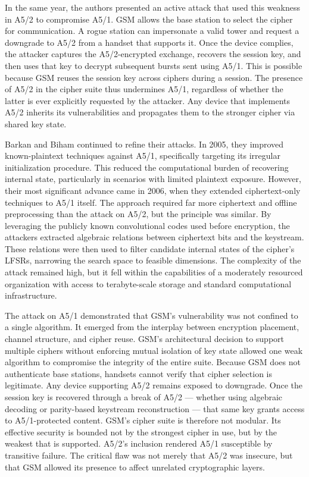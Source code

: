 In the same year, the authors presented an active attack that used this weakness in A5/2 to compromise A5/1. GSM allows the base station to select the cipher for communication. A rogue station can impersonate a valid tower and request a downgrade to A5/2 from a handset that supports it. Once the device complies, the attacker captures the A5/2-encrypted exchange, recovers the session key, and then uses that key to decrypt subsequent bursts sent using A5/1. This is possible because GSM reuses the session key across ciphers during a session. The presence of A5/2 in the cipher suite thus undermines A5/1, regardless of whether the latter is ever explicitly requested by the attacker. Any device that implements A5/2 inherits its vulnerabilities and propagates them to the stronger cipher via shared key state.

Barkan and Biham continued to refine their attacks. In 2005, they improved known-plaintext techniques against A5/1, specifically targeting its irregular initialization procedure. This reduced the computational burden of recovering internal state, particularly in scenarios with limited plaintext exposure. However, their most significant advance came in 2006, when they extended ciphertext-only techniques to A5/1 itself. The approach required far more ciphertext and offline preprocessing than the attack on A5/2, but the principle was similar. By leveraging the publicly known convolutional codes used before encryption, the attackers extracted algebraic relations between ciphertext bits and the keystream. These relations were then used to filter candidate internal states of the cipher’s LFSRs, narrowing the search space to feasible dimensions. The complexity of the attack remained high, but it fell within the capabilities of a moderately resourced organization with access to terabyte-scale storage and standard computational infrastructure.

The attack on A5/1 demonstrated that GSM’s vulnerability was not confined to a single algorithm. It emerged from the interplay between encryption placement, channel structure, and cipher reuse. GSM’s architectural decision to support multiple ciphers without enforcing mutual isolation of key state allowed one weak algorithm to compromise the integrity of the entire suite. Because GSM does not authenticate base stations, handsets cannot verify that cipher selection is legitimate. Any device supporting A5/2 remains exposed to downgrade. Once the session key is recovered through a break of A5/2 — whether using algebraic decoding or parity-based keystream reconstruction — that same key grants access to A5/1-protected content. GSM’s cipher suite is therefore not modular. Its effective security is bounded not by the strongest cipher in use, but by the weakest that is supported. A5/2’s inclusion rendered A5/1 susceptible by transitive failure. The critical flaw was not merely that A5/2 was insecure, but that GSM allowed its presence to affect unrelated cryptographic layers.


